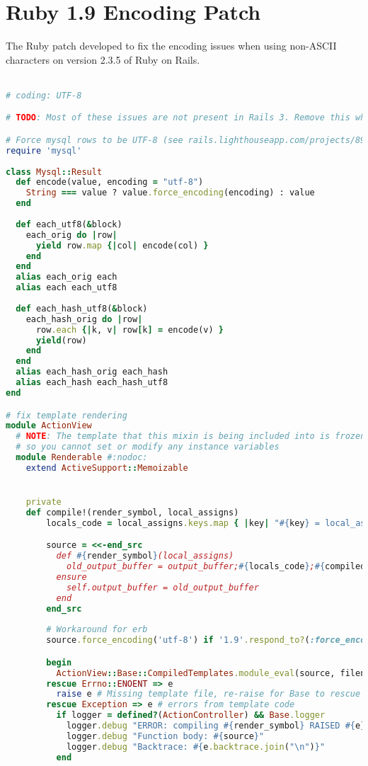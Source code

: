 \chapter{Ruby 1.9 Encoding Patch} %
\label{ap:ruby19_encoding_patch}

The Ruby patch developed to fix the encoding issues when using non-ASCII characters on version 2.3.5 of Ruby on Rails.\\\\

\begin{lstlisting}[language=ruby]
# coding: UTF-8

# TODO: Most of these issues are not present in Rails 3. Remove this when updating.

# Force mysql rows to be UTF-8 (see rails.lighthouseapp.com/projects/8994/tickets/2476)
require 'mysql'
 
class Mysql::Result
  def encode(value, encoding = "utf-8")
    String === value ? value.force_encoding(encoding) : value
  end
  
  def each_utf8(&block)
    each_orig do |row|
      yield row.map {|col| encode(col) }
    end
  end
  alias each_orig each
  alias each each_utf8
 
  def each_hash_utf8(&block)
    each_hash_orig do |row|
      row.each {|k, v| row[k] = encode(v) }
      yield(row)
    end
  end
  alias each_hash_orig each_hash
  alias each_hash each_hash_utf8
end

# fix template rendering
module ActionView
  # NOTE: The template that this mixin is being included into is frozen
  # so you cannot set or modify any instance variables
  module Renderable #:nodoc:
    extend ActiveSupport::Memoizable


    private    
    def compile!(render_symbol, local_assigns)
        locals_code = local_assigns.keys.map { |key| "#{key} = local_assigns[:#{key}];" }.join

        source = <<-end_src
          def #{render_symbol}(local_assigns)
            old_output_buffer = output_buffer;#{locals_code};#{compiled_source}
          ensure
            self.output_buffer = old_output_buffer
          end
        end_src
        
        # Workaround for erb
        source.force_encoding('utf-8') if '1.9'.respond_to?(:force_encoding)

        begin
          ActionView::Base::CompiledTemplates.module_eval(source, filename, 0)
        rescue Errno::ENOENT => e
          raise e # Missing template file, re-raise for Base to rescue
        rescue Exception => e # errors from template code
          if logger = defined?(ActionController) && Base.logger
            logger.debug "ERROR: compiling #{render_symbol} RAISED #{e}"
            logger.debug "Function body: #{source}"
            logger.debug "Backtrace: #{e.backtrace.join("\n")}"
          end


\end{lstlisting}
